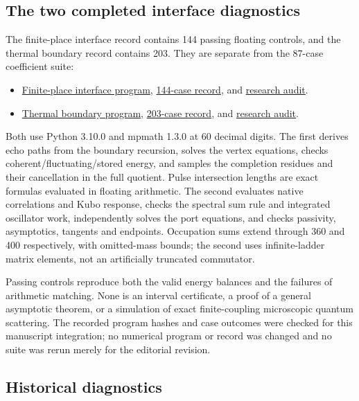 \subsection{The two completed interface diagnostics}

The finite-place interface record contains 144 passing floating controls,
and the thermal boundary record contains 203. They are separate from
the 87-case coefficient suite:
\begin{itemize}
\item \href{numerics/check_finite_place_interface.py}{Finite-place interface program},
\href{numerics/records/finite-place-interface-20260923.json}{144-case record}, and
\href{reviews/review_codex_finite_place_interface_20260923.md}{research audit}.
\item \href{numerics/check_thermal_boundary_structure.py}{Thermal boundary program},
\href{numerics/records/thermal-boundary-structure-20260923.json}{203-case record}, and
\href{reviews/review_codex_thermal_boundary_structure_20260923.md}{research audit}.
\end{itemize}
Both use Python 3.10.0 and mpmath 1.3.0 at 60 decimal digits. The
first derives echo paths from the boundary recursion, solves the vertex
equations, checks coherent/fluctuating/stored energy, and samples the
completion residues and their cancellation in the full quotient. Pulse
intersection lengths are exact formulas evaluated in floating arithmetic.
The second evaluates native correlations and Kubo response, checks the
spectral sum rule and integrated oscillator work, independently solves
the port equations, and checks passivity, asymptotics, tangents and
endpoints. Occupation sums extend through 360 and 400 respectively,
with omitted-mass bounds; the second uses infinite-ladder matrix elements,
not an artificially truncated commutator.

Passing controls reproduce both the valid energy balances and the
failures of arithmetic matching. None is an interval certificate,
a proof of a general asymptotic theorem, or a simulation of exact
finite-coupling microscopic quantum scattering. The recorded program
hashes and case outcomes were checked for this manuscript integration;
no numerical program or record was changed and no suite was rerun
merely for the editorial revision.

\subsection{Historical diagnostics}

